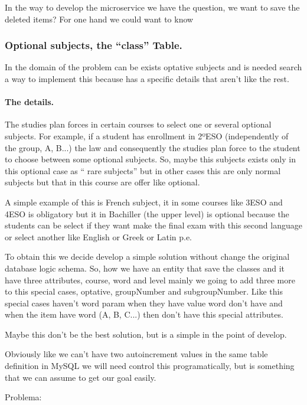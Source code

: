 \documentclass[oneside,english,titlepage]{scrbook}
\begin{document}
In the way to develop the microservice we have the question, we want
to save the deleted items? For one hand we could want to know

\subsubsection{Optional subjects, the ``class'' Table.}

In the domain of the problem can be exists optative subjects and is
needed search a way to implement this because has a specific details
that aren't like the rest.

\paragraph{The details.}

The studies plan forces in certain courses to select one or several
optional subjects. For example, if a student has enrollment in 2ºESO
(independently of the group, A, B...) the law and consequently the
studies plan force to the student to choose between some optional
subjects. So, maybe this subjects exists only in this optional case
as `` rare subjects'' but in other cases this are only normal subjects
but that in this course are offer like optional.

A simple example of this is French subject, it in some courses like
3ESO and 4ESO is obligatory but it in Bachiller (the upper level)
is optional because the students can be select if they want make the
final exam with this second language or select another like English
or Greek or Latin p.e.

To obtain this we decide develop a simple solution without change
the original database logic schema. So, how we have an entity that
save the classes and it have three attributes, course, word and level
mainly we going to add three more to this special cases, optative,
groupNumber and subgroupNumber. Like this special cases haven't word
param when they have value word don't have and when the item have
word (A, B, C...) then don't have this special attributes.

Maybe this don't be the best solution, but is a simple in the point
of develop.

Obviously like we can't have two autoincrement values in the same
table definition in MySQL we will need control this programatically,
but is something that we can assume to get our goal easily.

Problema:
\end{document}

